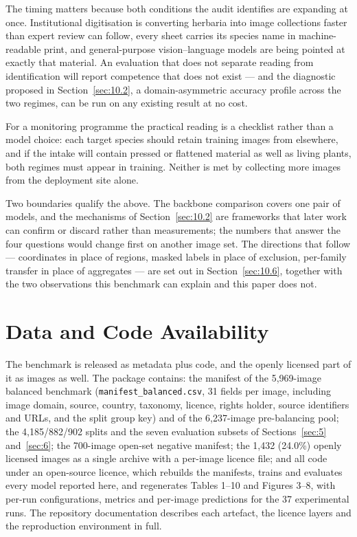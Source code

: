 \documentclass[preprint,12pt,authoryear]{elsarticle}
\begin{document}
The timing matters because both conditions the audit identifies are expanding at once. Institutional digitisation is converting herbaria into image collections faster than expert review can follow, every sheet carries its species name in machine-readable print, and general-purpose vision--language models are being pointed at exactly that material. An evaluation that does not separate reading from identification will report competence that does not exist --- and the diagnostic proposed in Section~\ref{sec:10.2}, a domain-asymmetric accuracy profile across the two regimes, can be run on any existing result at no cost.

For a monitoring programme the practical reading is a checklist rather than a model choice: each target species should retain training images from elsewhere, and if the intake will contain pressed or flattened material as well as living plants, both regimes must appear in training. Neither is met by collecting more images from the deployment site alone.

Two boundaries qualify the above. The backbone comparison covers one pair of models, and the mechanisms of Section~\ref{sec:10.2} are frameworks that later work can confirm or discard rather than measurements; the numbers that answer the four questions would change first on another image set. The directions that follow --- coordinates in place of regions, masked labels in place of exclusion, per-family transfer in place of aggregates --- are set out in Section~\ref{sec:10.6}, together with the two observations this benchmark can explain and this paper does not.

\setcounter{section}{11}

\section{Data and Code Availability}\label{sec:12}

The benchmark is released as metadata plus code, and the openly licensed part of it as images as well. The package contains: the manifest of the 5,969-image balanced benchmark (\texttt{manifest\_balanced.\allowbreak{}csv}, 31 fields per image, including image domain, source, country, taxonomy, licence, rights holder, source identifiers and URLs, and the split group key) and of the 6,237-image pre-balancing pool; the 4,185/882/902 splits and the seven evaluation subsets of Sections~\ref{sec:5} and~\ref{sec:6}; the 700-image open-set negative manifest; the 1,432 (24.0\%) openly licensed images as a single archive with a per-image licence file; and all code under an open-source licence, which rebuilds the manifests, trains and evaluates every model reported here, and regenerates Tables 1--10 and Figures 3--8, with per-run configurations, metrics and per-image predictions for the 37 experimental runs. The repository documentation describes each artefact, the licence layers and the reproduction environment in full.
\end{document}
